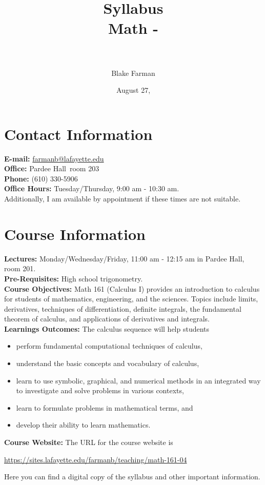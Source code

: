 \documentclass[10pt]{amsart}
\author[Blake Farman]{Blake Farman\\ \school}
\title[Math \course-\courseSection]{Syllabus\\Math \course-\courseSection \\ \semester\ \year}
\date{August 27, \year}
\def\building{Pardee Hall}
\def\officeNumber{203}
\def\courseWebsite{https://sites.lafayette.edu/farmanb/teaching/math-161-04}
\begin{document}
\maketitle

\section*{Contact Information}
\noindent
\textbf{E-mail:} \href{mailto:farmanb@lafayette.edu}{farmanb@lafayette.edu}\\
\textbf{Office:} \building\ room \officeNumber\\
\textbf{Phone:} (610) 330-5906\\
\textbf{Office Hours:} Tuesday/Thursday, 9:00 am - 10:30 am.\\
Additionally, I am available by appointment if these times are not suitable.

\section*{Course Information}
\noindent
\textbf{Lectures:}
Monday/Wednesday/Friday,  11:00 am - 12:15 am in Pardee Hall, room 201.\\

\noindent\textbf{Pre-Requisites:} High school trigonometry.\\

\noindent\textbf{Course Objectives:}
Math 161 (Calculus I) provides an introduction to calculus for students of mathematics, engineering, and the sciences. Topics include limits, derivatives, techniques of differentiation, definite integrals, the fundamental theorem of calculus, and applications of derivatives and integrals.\\

\noindent\textbf{Learnings Outcomes:}
The calculus sequence will help students
\begin{itemize}
\item
  perform fundamental computational techniques of calculus,
\item
  understand the basic concepts and vocabulary of calculus,
\item
  learn to use symbolic, graphical, and numerical methods in an integrated way to investigate and solve problems in various contexts,
\item
  learn to formulate problems in mathematical terms, and
\item
  develop their ability to learn mathematics.
\end{itemize}
\noindent\textbf{Course Website:} The URL for the course website is
\begin{center}
  \url{\courseWebsite}
\end{center}
Here you can find a digital copy of the syllabus and other important information.\\
\end{document}
